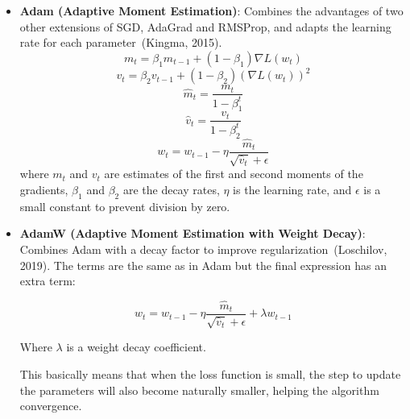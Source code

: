 \documentclass[a4paper, 11pt]{report}
\begin{document}
\begin{itemize}
\item \textbf{Adam (Adaptive Moment Estimation)}: Combines the advantages of two other extensions of SGD, AdaGrad and RMSProp, and adapts the learning rate for each parameter~\cite{Kingma2015_Adam}(Kingma, 2015).
\begin{equation*}
m_t = \beta_1 m_{t-1} + (1 - \beta_1) \nabla L(w_t)
\end{equation*}
\begin{equation*}
v_t = \beta_2 v_{t-1} + (1 - \beta_2) (\nabla L(w_t))^2
\end{equation*}
\begin{equation*}
\hat{m}_t = \frac{m_t}{1 - \beta_1^t}
\end{equation*}
\begin{equation*}
\hat{v}_t = \frac{v_t}{1 - \beta_2^t}
\end{equation*}
\begin{equation*}
w_t = w_{t-1} - \eta \frac{\hat{m}_t}{\sqrt{\hat{v}_t} + \epsilon}
\end{equation*}
where \(m_t\) and \(v_t\) are estimates of the first and second moments of the gradients, \(\beta_1\) and \(\beta_2\) are the decay rates, \(\eta\) is the learning rate, and \(\epsilon\) is a small constant to prevent division by zero.


\item \textbf{AdamW (Adaptive Moment Estimation with Weight Decay)}: Combines Adam with a decay factor to improve regularization~\cite{Loshchilov2019_AdamW}(Loschilov, 2019). The terms are the same as in Adam but the final expression has an extra term:

\begin{equation*}
w_t = w_{t-1} - \eta \frac{\hat{m}_t}{\sqrt{\hat{v}_t} + \epsilon} + \lambda w_{t-1}
\end{equation*}

Where $\lambda$ is a weight decay coefficient.

This basically means that when the loss function is small, the step to update the parameters will also become naturally smaller, helping the algorithm convergence.
\end{itemize}
\end{document}
